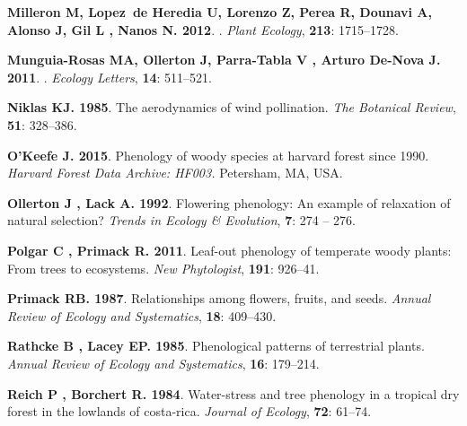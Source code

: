 \documentclass[11pt]{article}
\begin{document}
\begin{thebibliography}{48}
{\bf Milleron M, Lopez~de Heredia U, Lorenzo Z, Perea R, Dounavi A, Alonso J,
  Gil L , Nanos N}{\bf . {2012}}.
.
\newblock \emph{{Plant Ecology}}, {\bf {213}}: {1715--1728}.

{\bf Munguia-Rosas MA, Ollerton J, Parra-Tabla V , Arturo De-Nova J}{\bf .
  {2011}}.
.
\newblock \emph{{Ecology Letters}}, {\bf {14}}: {511--521}.

{\bf Niklas KJ}{\bf . 1985}.
\newblock The aerodynamics of wind pollination.
\newblock \emph{The Botanical Review}, {\bf 51}: 328--386.

{\bf O'Keefe J}{\bf . 2015}.
\newblock Phenology of woody species at harvard forest since 1990.
\newblock \emph{Harvard Forest Data Archive: HF003.} Petersham, MA, USA.

{\bf Ollerton J , Lack A}{\bf . 1992}.
\newblock Flowering phenology: An example of relaxation of natural selection?
\newblock \emph{Trends in Ecology \& Evolution}, {\bf 7}: 274 -- 276.

{\bf Polgar C , Primack R}{\bf . 2011}.
\newblock Leaf-out phenology of temperate woody plants: From trees to
  ecosystems.
\newblock \emph{New Phytologist}, {\bf 191}: 926--41.

{\bf Primack RB}{\bf . 1987}.
\newblock Relationships among flowers, fruits, and seeds.
\newblock \emph{Annual Review of Ecology and Systematics}, {\bf 18}: 409--430.

{\bf Rathcke B , Lacey EP}{\bf . 1985}.
\newblock Phenological patterns of terrestrial plants.
\newblock \emph{Annual Review of Ecology and Systematics}, {\bf 16}: 179--214.

{\bf Reich P , Borchert R}{\bf . {1984}}.
\newblock Water-stress and tree phenology in a tropical dry forest in the
  lowlands of costa-rica.
\newblock \emph{{Journal of Ecology}}, {\bf {72}}: {61--74}.


\end{thebibliography}
\end{document}
